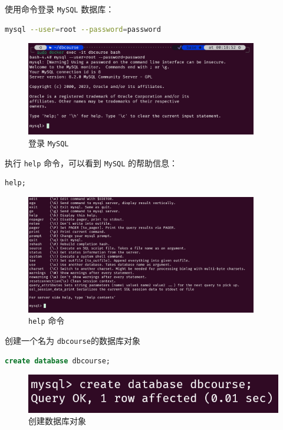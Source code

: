 \documentclass{article}
\begin{document}
使用命令登录 \texttt{MySQL} 数据库：

\begin{lstlisting}[language=bash]
mysql --user=root --password=password
\end{lstlisting}

\begin{figure}[H]
  \centering
  \includegraphics[width=0.9\textwidth]{img/6.png}
  \caption{登录 \texttt{MySQL}}
\end{figure}

执行 \texttt{help} 命令，可以看到 \texttt{MySQL} 的帮助信息：

\begin{lstlisting}[language=sql]
help;
\end{lstlisting}

\begin{figure}[H]
  \centering
  \includegraphics[width=0.9\textwidth]{img/7.png}
  \caption{\texttt{help} 命令}
\end{figure}

创建一个名为 \texttt{dbcourse}的数据库对象

\begin{lstlisting}[language=sql]
create database dbcourse;
\end{lstlisting}

\begin{figure}[H]
  \centering
  \includegraphics[width=12cm]{img/8.png}
  \caption{创建数据库对象}
\end{figure}
\end{document}

